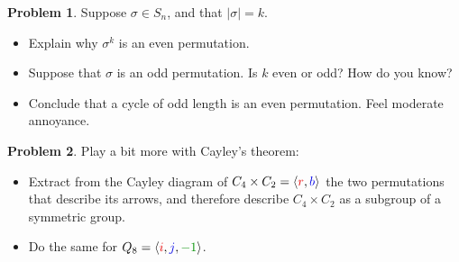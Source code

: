 \documentclass[12pt]{article}
\theoremstyle{definition} %
\newtheorem{problem}{Problem}
\newcommand{\Alert}[1]{\textcolor{xRed}{#1}}
\newcommand{\Balert}[1]{\textcolor{xBlue}{#1}}
\newcommand{\Galert}[1]{\textcolor{xGreen}{#1}}
\def\<{\langle}
\def\>{\rangle}
\begin{document}
\begin{problem}
    Suppose $\sigma \in S_n$, and that $|\sigma| = k$. 
    \begin{itemize}
        \item Explain why $\sigma^k$ is an even permutation.
        \item Suppose that $\sigma$ is an odd permutation. Is $k$ even or odd? How do you know?
        \item Conclude that a cycle of odd length is an even permutation. Feel moderate annoyance.
    \end{itemize}
\end{problem}

\begin{problem}
    Play a bit more with Cayley's theorem:
    \begin{itemize}
        \item Extract from the Cayley diagram of $C_4\times C_2 = \< \Alert{r}, \Balert{b} \>$ the two permutations that describe its arrows, and therefore describe $C_4 \times C_2$ as a subgroup of a symmetric group.
        \item Do the same for $Q_8 = \< \Alert{i}, \Balert{j}, \Galert{-1} \>$.


\end{itemize}
\end{problem}
\end{document}
